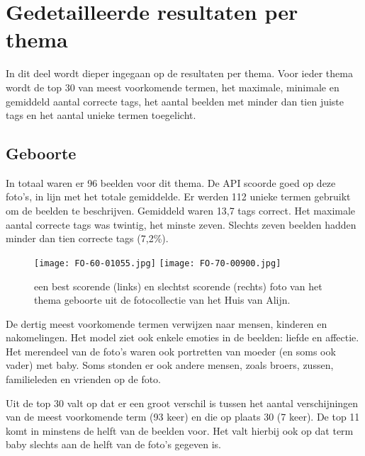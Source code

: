 \section{Gedetailleerde resultaten per thema}
\label{sec:gedetailleerde-resultaten-per-thema}

In dit deel wordt dieper ingegaan op de resultaten per thema. Voor ieder thema wordt de top 30 van meest voorkomende termen, het maximale, minimale en gemiddeld aantal correcte tags, het aantal beelden met minder dan tien juiste tags en het aantal unieke termen toegelicht. 

\subsection{Geboorte}

In totaal waren er 96 beelden voor dit thema. De API scoorde goed op deze foto’s, in lijn met het totale gemiddelde. Er werden 112 unieke termen gebruikt om de beelden te beschrijven. Gemiddeld waren 13,7 tags correct. Het maximale aantal correcte tags was twintig, het minste zeven. Slechts zeven beelden hadden minder dan tien correcte tags (7,2\%).

\begin{figure}
	\centering
	\texttt{[image: FO-60-01055.jpg]}\hfill
	\texttt{[image: FO-70-00900.jpg]}\hfill
	\caption[Best en slechtst scorende foto van thema geboorte]{een best scorende (links) en slechtst scorende (rechts) foto van het thema geboorte uit de fotocollectie van het Huis van Alijn.}
\end{figure}

De dertig meest voorkomende termen verwijzen naar mensen, kinderen en nakomelingen. Het model ziet ook enkele emoties in de beelden: liefde en affectie. Het merendeel van de foto’s waren ook portretten van moeder (en soms ook vader) met baby. Soms stonden er ook andere mensen, zoals broers, zussen, familieleden en vrienden op de foto. 

Uit de top 30 valt op dat er een groot verschil is tussen het aantal verschijningen van de meest voorkomende term (93 keer) en die op plaats 30 (7 keer). De top 11 komt in minstens de helft van de beelden voor. Het valt hierbij ook op dat term baby slechts aan de helft van de foto’s gegeven is.

